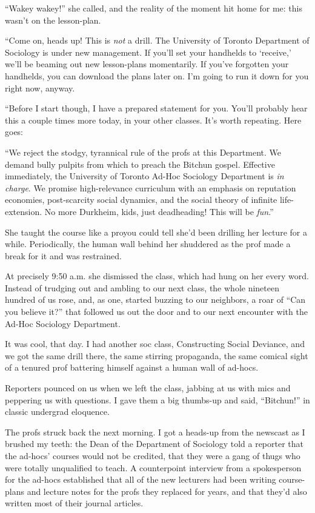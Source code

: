 “Wakey wakey!” she called, and the reality of the moment hit home
for me: this wasn't on the lesson-plan.

“Come on, heads up! This is \emph{not} a drill. The University of
Toronto Department of Sociology is under new management. If you'll
set your handhelds to ‘receive,’ we'll be beaming out new
lesson-plans momentarily. If you've forgotten your handhelds, you
can download the plans later on. I'm going to run it down for you
right now, anyway.

“Before I start though, I have a prepared statement for you. You'll
probably hear this a couple times more today, in your other
classes. It's worth repeating. Here goes:

“We reject the stodgy, tyrannical rule of the profs at this
Department. We demand bully pulpits from which to preach the
Bitchun gospel. Effective immediately, the University of Toronto
Ad-Hoc Sociology Department is \emph{in charge}. We promise
high-relevance curriculum with an emphasis on reputation economies,
post-scarcity social dynamics, and the social theory of infinite
life-extension. No more Durkheim, kids, just deadheading! This will
be \emph{fun}.”

She taught the course like a pro{\dash}you could tell she'd been drilling
her lecture for a while. Periodically, the human wall behind her
shuddered as the prof made a break for it and was restrained.

At precisely 9:50 a.m. she dismissed the class, which had hung on
her every word. Instead of trudging out and ambling to our next
class, the whole nineteen hundred of us rose, and, as one, started
buzzing to our neighbors, a roar of “Can you believe it?” that
followed us out the door and to our next encounter with the Ad-Hoc
Sociology Department.

It was cool, that day. I had another soc class, Constructing Social
Deviance, and we got the same drill there, the same stirring
propaganda, the same comical sight of a tenured prof battering
himself against a human wall of ad-hocs.

Reporters pounced on us when we left the class, jabbing at us with
mics and peppering us with questions. I gave them a big thumbs-up
and said, “Bitchun!” in classic undergrad eloquence.

The profs struck back the next morning. I got a heads-up from the
newscast as I brushed my teeth: the Dean of the Department of
Sociology told a reporter that the ad-hocs' courses would not be
credited, that they were a gang of thugs who were totally
unqualified to teach. A counterpoint interview from a spokesperson
for the ad-hocs established that all of the new lecturers had been
writing course-plans and lecture notes for the profs they replaced
for years, and that they'd also written most of their journal
articles.

